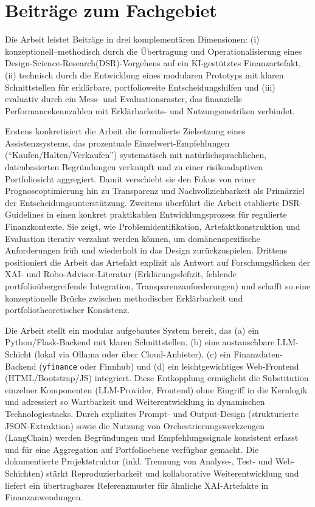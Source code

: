   \section{Beiträge zum Fachgebiet}
  \label{sec:beitraege}

    Die Arbeit leistet Beiträge in drei komplementären Dimensionen:
    (i) konzeptionell–methodisch durch die Übertragung und Operationalisierung eines Design-Science-Research(\acs{DSR})-Vorgehens auf ein \acs{KI}-gestütztes Finanzartefakt,
    (ii) technisch durch die Entwicklung eines modularen Prototyps mit klaren Schnittstellen für erklärbare, portfolioweite Entscheidungshilfen
    und (iii) evaluativ durch ein Mess- und Evaluationsraster, das finanzielle Performancekennzahlen mit Erklärbarkeits- und Nutzungsmetriken verbindet.

    Erstens konkretisiert die Arbeit die formulierte Zielsetzung eines Assistenzsystems, das prozentuale Einzelwert-Empfehlungen (\enquote{Kaufen/Halten/Verkaufen}) systematisch mit natürlichsprachlichen, datenbasierten Begründungen verknüpft und zu einer risikoadaptiven Portfoliosicht aggregiert.
    Damit verschiebt sie den Fokus von reiner Prognoseoptimierung hin zu Transparenz und Nachvollziehbarkeit als Primärziel der Entscheidungsunterstützung.
    Zweitens überführt die Arbeit etablierte \acs{DSR}-Guidelines in einen konkret praktikablen Entwicklungsprozess für regulierte Finanzkontexte.
    Sie zeigt, wie Problemidentifikation, Artefaktkonstruktion und Evaluation iterativ verzahnt werden können, um domänenspezifische Anforderungen früh und wiederholt in das Design zurückzuspielen.
    Drittens positioniert die Arbeit das Artefakt explizit als Antwort auf Forschungslücken der \acs{XAI}- und Robo-Advisor-Literatur (Erklärungsdefizit, fehlende portfolioübergreifende Integration, Transparenzanforderungen) und schafft so eine konzeptionelle Brücke zwischen methodischer Erklärbarkeit und portfoliotheoretischer Konsistenz.

    Die Arbeit stellt ein modular aufgebautes System bereit, das (a) ein Python/Flask-Backend mit klaren Schnittstellen, (b) eine austauschbare \acs{LLM}-Schicht (lokal via Ollama oder über Cloud-Anbieter), (c) ein Finanzdaten-Backend (\texttt{yfinance} oder Finnhub) und (d) ein leichtgewichtiges Web-Frontend (HTML/Bootstrap/JS) integriert.
    Diese Entkopplung ermöglicht die Substitution einzelner Komponenten (\acs{LLM}-Provider, Frontend) ohne Eingriff in die Kernlogik und adressiert so Wartbarkeit und Weiterentwicklung in dynamischen Technologiestacks.
    Durch explizites Prompt- und Output-Design (strukturierte \acs{JSON}-Extraktion) sowie die Nutzung von Orchestrierungswerkzeugen (LangChain) werden Begründungen und Empfehlungssignale konsistent erfasst und für eine Aggregation auf Portfolioebene verfügbar gemacht.
    Die dokumentierte Projektstruktur (inkl. Trennung von Analyse-, Test- und Web-Schichten) stärkt Reproduzierbarkeit und kollaborative Weiterentwicklung und liefert ein übertragbares Referenzmuster für ähnliche \acs{XAI}-Artefakte in Finanzanwendungen.

